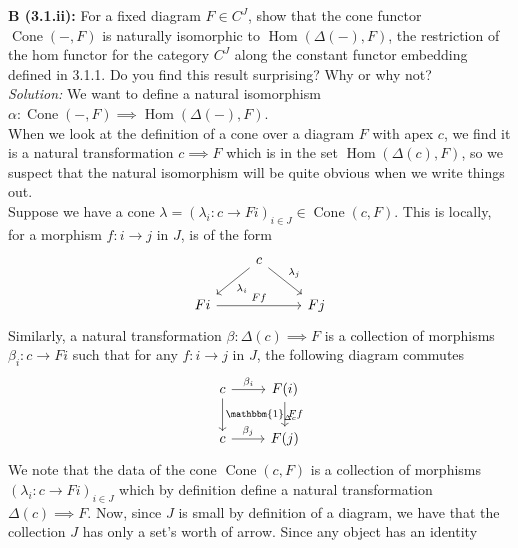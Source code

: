 \documentclass[a4paper]{article}
\DeclareMathOperator{\Hom}{Hom}
\DeclareMathOperator{\Cone}{Cone}
\begin{document}
    \textbf{B (3.1.ii):} For a fixed diagram $F \in C^{J}$, show that the cone
    functor $\Cone (-, F)$ is naturally isomorphic to
    $\Hom \left( \Delta (-), F \right) $, the restriction of the hom functor
    for the category $C^{J}$ along the constant functor embedding defined in
    3.1.1. Do you find this result surprising? Why or why not?\\
    \linebreak
    \textit{Solution:} We want to define a natural isomorphism
    $\alpha  \colon \Cone(-,F) \implies \Hom \left( \Delta (-),F \right) $.\\
    When we look at the definition of a cone over a diagram $F$ with apex $c$,
    we find it is a natural transformation $c \implies F$ which is
    in the set $\Hom \left( \Delta(c) , F \right) $, so we suspect that the
    natural isomorphism will be quite obvious when we write things out.\\
    \linebreak
    Suppose we have a cone $\lambda
    = \left( \lambda_i  \colon c \to Fi \right)_{i \in J}
    \in \Cone(c,F)$. This is locally, for
    a morphism $f  \colon i \to j$ in $J$, is of the form
    \begin{equation*}
    \begin{tikzcd}
        & c \arrow[dl, "\lambda_i"] \arrow[dr, "\lambda_j"] &\\
        Fi \arrow[rr, "Ff"] & & Fj
    \end{tikzcd}
    \end{equation*}
    Similarly, a natural transformation
    $\beta  \colon \Delta(c) \implies F$ is a collection of morphisms
    $\beta_i  \colon c \to F i$ such that for any $f  \colon i \to j$ in $J$, the following diagram commutes
    \begin{equation*}
    \begin{tikzcd}
        c \arrow[r, "\beta_i"] \arrow[d, "\mathbbm{1}_{\Delta c}"] & F(i) \arrow[d,
        "Ff"] \\
        c \arrow[r, "\beta_j"] & F(j)
    \end{tikzcd}
    \end{equation*}
    We note that the data of the cone $\Cone(c,F)$ is a collection of morphisms
    $\left( \lambda_i  \colon c \to F i \right)_{i \in J}$ which by definition
    define a natural transformation $\Delta(c) \implies F$. Now, since
    $J$ is small by definition of a diagram, we have that the collection
    $J$ has only a set's worth of arrow. Since any object has an identity
\end{document}
